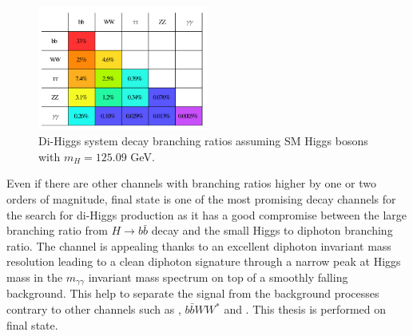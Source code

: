 \begin{figure}[htbp]
    \centering
    \includegraphics[width=0.5\textwidth]{Ch1/Img/HH_decays.png}
    \caption{Di-Higgs system decay branching ratios assuming SM Higgs bosons with $m_H=125.09$ GeV.}
    \label{fig:chap1:HH:HPD:DCY}
\end{figure}
Even if there are other channels with branching ratios higher by one or two orders of magnitude, \bbyy final state is one of the most promising decay channels for the search for di-Higgs production as it has a good compromise between the large branching ratio from $H\to b\bar{b}$ decay and the small Higgs to diphoton branching ratio. The \bbyy channel is appealing thanks to an excellent diphoton invariant mass resolution leading to a clean diphoton signature through a narrow peak at Higgs mass in the $m_{\gamma\gamma}$ invariant mass spectrum on top of a smoothly falling background. This help to separate the signal from the background processes contrary to other channels such as \bbbb, $b\bar{b}WW^*$ and \bbtt. This thesis is performed on \bbyy final state.
\clearpage
